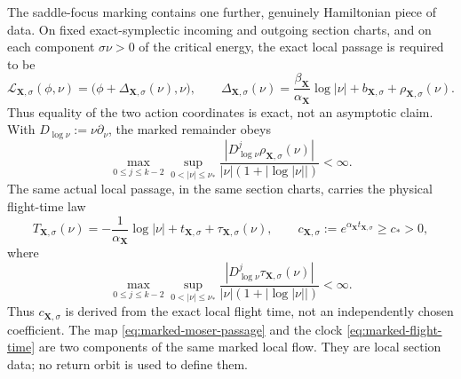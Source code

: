 \documentclass[11pt]{amsart}
\numberwithin{equation}{section}
\theoremstyle{definition}
\theoremstyle{remark}
\begin{document}
The saddle-focus marking contains one further, genuinely Hamiltonian piece
of data.  On fixed exact-symplectic incoming and outgoing section charts,
and on each component $\sigma\nu>0$ of the critical energy, the exact local
passage is required to be
\begin{equation}\label{eq:marked-moser-passage}
 \mathcal L_{\mathbf X,\sigma}(\phi,\nu)
   =\bigl(\phi+\Delta_{\mathbf X,\sigma}(\nu),\nu\bigr),
 \qquad
 \Delta_{\mathbf X,\sigma}(\nu)
   =\frac{\beta_{\mathbf X}}{\alpha_{\mathbf X}}\log|\nu|
      +b_{\mathbf X,\sigma}+\rho_{\mathbf X,\sigma}(\nu).
\end{equation}
Thus equality of the two action coordinates is exact, not an asymptotic
claim.  With $D_{\log\nu}:=\nu\partial_\nu$, the marked remainder obeys
\begin{equation}\label{eq:marked-moser-remainder}
 \max_{0\le j\le k-2}\sup_{0<|\nu|\le\nu_*}
 \frac{|D_{\log\nu}^j\rho_{\mathbf X,\sigma}(\nu)|}
 {|\nu|(1+|\log|\nu||)}<\infty.
\end{equation}
The same actual local passage, in the same section charts, carries the
physical flight-time law
\begin{equation}\label{eq:marked-flight-time}
 T_{\mathbf X,\sigma}(\nu)
 =-\frac1{\alpha_{\mathbf X}}\log|\nu|
    +t_{\mathbf X,\sigma}+\tau_{\mathbf X,\sigma}(\nu),
 \qquad
 c_{\mathbf X,\sigma}:=e^{\alpha_{\mathbf X}t_{\mathbf X,\sigma}}
 \ge c_*>0,
\end{equation}
where
\begin{equation}\label{eq:marked-time-remainder}
 \max_{0\le j\le k-2}\sup_{0<|\nu|\le\nu_*}
 \frac{|D_{\log\nu}^j\tau_{\mathbf X,\sigma}(\nu)|}
 {|\nu|(1+|\log|\nu||)}<\infty.
\end{equation}
Thus $c_{\mathbf X,\sigma}$ is derived from the exact local flight time,
not an independently chosen coefficient.  The map
\eqref{eq:marked-moser-passage} and the clock
\eqref{eq:marked-flight-time} are two components of the same marked local
flow.  They are local section data; no return orbit is used to define them.
\end{document}
